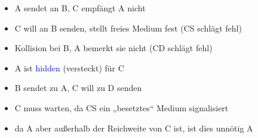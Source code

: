 \begin{itemize}
    \item A sendet an B, C empfängt A nicht
    \item C will an B senden, stellt freies Medium fest (CS schlägt fehl)
    \item Kollision bei B, A bemerkt sie nicht (CD schlägt fehl)
    \item A ist \textcolor{blue}{hidden} (versteckt) für C
\end{itemize}

\begin{itemize}
    \item B sendet zu A, C will zu D senden
    \item C muss warten, da CS ein „besetztes“ Medium signalisiert
    \item da A aber außerhalb der Reichweite von C ist, ist dies unnötig A
\end{itemize}

